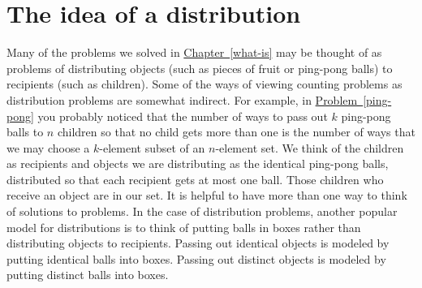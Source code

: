 \documentclass[10pt,]{book}
\theoremstyle{plain}
\theoremstyle{definition}
\theoremstyle{definition}
\numberwithin{equation}{chapter}
\begin{document}
\section[{The idea of a distribution}]{The idea of a distribution}\label{s3-1-distrib-idea}
Many of the problems we solved in \hyperref[what-is]{Chapter~\ref{what-is}} may be thought of as problems of distributing objects (such as pieces of fruit or ping-pong balls) to recipients (such as children). Some of the ways of viewing counting problems as distribution problems are somewhat indirect. For example, in \hyperref[ping-pong]{Problem~\ref{ping-pong}} you probably noticed that the number of ways to pass out \(k\) ping-pong balls to \(n\) children so that no child gets more than one is the number of ways that we may choose a \(k\)-element subset of an \(n\)-element set. We think of the children as recipients and objects we are distributing as the identical ping-pong balls, distributed so that each recipient gets at most one ball. Those children who receive an object are in our set. It is helpful to have more than one way to think of solutions to problems. In the case of distribution problems, another popular model for distributions is to think of putting balls in boxes rather than distributing objects to recipients. Passing out identical objects is modeled by putting identical balls into boxes. Passing out distinct objects is modeled by putting distinct balls into boxes.%
\typeout{************************************************}
\typeout{************************************************}
\end{document}
